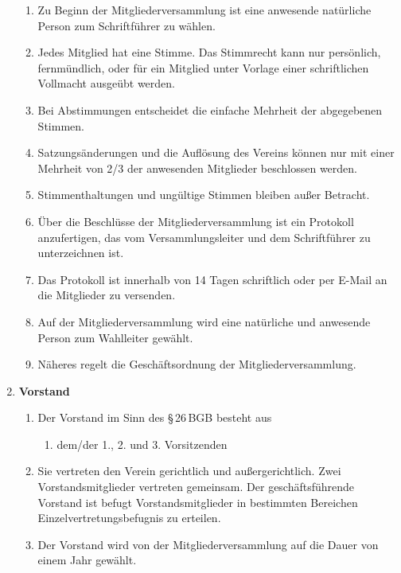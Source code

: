 \documentclass[german]{article}
\newcommand{\paragr}[1]{\item \textsf{\textbf{#1}}}
\begin{document}
\begin{enumerate}
\begin{enumerate}
\item Zu Beginn der Mitgliederversammlung ist eine anwesende natürliche Person zum Schriftführer zu wählen.

\item Jedes Mitglied hat eine Stimme. Das Stimmrecht kann nur persönlich, fernmündlich, oder für ein Mitglied unter Vorlage einer schriftlichen Vollmacht ausgeübt werden.

\item Bei Abstimmungen entscheidet die einfache Mehrheit der abgegebenen Stimmen.

\item Satzungsänderungen und die Auflösung des Vereins können nur mit einer Mehrheit von 2/3 der anwesenden Mitglieder beschlossen werden.

\item Stimmenthaltungen und ungültige Stimmen bleiben außer Betracht.

\item Über die Beschlüsse der Mitgliederversammlung ist ein Protokoll anzufertigen, das vom Versammlungsleiter und dem Schriftführer zu unterzeichnen ist.

\item Das Protokoll ist innerhalb von 14 Tagen schriftlich oder per E-Mail an die Mitglieder zu versenden.

\item Auf der Mitgliederversammlung wird eine natürliche und anwesende Person zum Wahlleiter gewählt.

\item Näheres regelt die Geschäftsordnung der Mitgliederversammlung.

\end{enumerate}


\paragr{Vorstand}
\begin{enumerate}

\item Der Vorstand im Sinn des §\,26\,BGB besteht aus
\begin{enumerate}
\item dem/der 1., 2. und 3. Vorsitzenden
\end{enumerate}

\item Sie vertreten den Verein gerichtlich und außergerichtlich.
Zwei Vorstandsmitglieder vertreten gemeinsam. Der geschäftsführende Vorstand ist befugt Vorstandsmitglieder in bestimmten Bereichen Einzelvertretungsbefugnis zu erteilen.

\item Der Vorstand wird von der Mitgliederversammlung auf die Dauer von einem Jahr gewählt.


\end{enumerate}
\end{enumerate}
\end{document}
